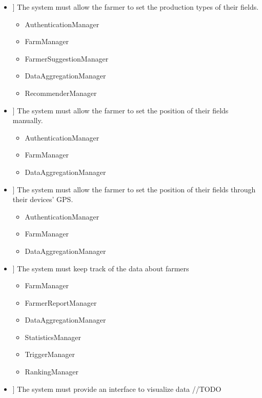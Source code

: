 \newcommand\req[1]{\item[[ R#1]]}

\begin{itemize}
\req{1} The system must allow the farmer to set the production types of their fields.

\begin{itemize}

\item AuthenticationManager
\item FarmManager
\item FarmerSuggestionManager
\item DataAggregationManager
\item RecommenderManager
\end{itemize}

\req{2} The system must allow the farmer to set the position of their fields manually.
\begin{itemize}

\item AuthenticationManager
\item FarmManager
\item DataAggregationManager

\end{itemize}
\req{3} The system must allow the farmer to set the position of their fields through their devices' GPS.
\begin{itemize}

\item AuthenticationManager
\item FarmManager
\item DataAggregationManager
\end{itemize}

\req{4} The system must keep track of the data about farmers
\begin{itemize}


\item FarmManager
\item FarmerReportManager
\item DataAggregationManager
\item StatisticsManager
\item TriggerManager
\item RankingManager

\end{itemize}
\req{5} The system must provide an interface to visualize data //TODO
\begin{itemize}


\end{itemize}
\end{itemize}

